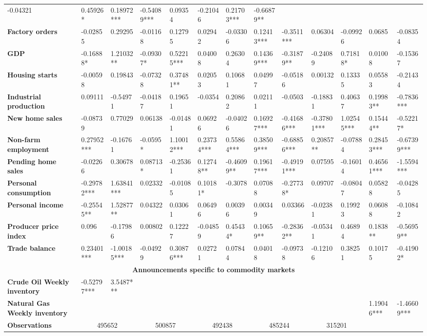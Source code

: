 \begin{sidewaystable}
{\begin{tabular}{@{}lllllllllllll@{}}
-0.04321 & 0.45926* & 0.18972*** & -0.54089*** & 0.09354 & -0.21046 & 0.21703*** & -0.66879** \\ \textbf{Factory orders}& -0.02855 & 0.29295 & -0.01168 & 0.12795 & 0.02942 & -0.03306 & 0.12413*** & -0.3511*** & 0.06304 & -0.09926 & 0.0685 & -0.08354 \\ \textbf{GDP}& -0.16888* & 1.21032** & -0.09307* & 0.52215*** & 0.04008 & 0.26304 & 0.14369*** & -0.31879** & -0.24089 & 0.71818* & 0.01008 & -0.15367 \\ \textbf{Housing starts}& -0.00598 & 0.19843 & -0.07328 & 0.37481** & 0.02053 & 0.10681 & 0.04997 & -0.05186 & 0.00132 & 0.13335 & 0.05583 & -0.21434 \\ \textbf{Industrial production}& 0.09111 & -0.54971 & -0.04187 & 0.19651 & -0.0354 & 0.20862 & 0.02111 & -0.0503 & -0.18831 & 0.40637 & 0.19983** & -0.7836*** \\ \textbf{New home sales}& -0.08739 & 0.77029 & 0.06138 & -0.01481 & 0.06926 & -0.04026 & 0.16927*** & -0.41686*** & -0.37801*** & 1.02545*** & 0.15444** & -0.52217* \\ \textbf{Non-farm employment}& 0.27952*** & -0.16761 & -0.0595* & 1.10012*** & 0.23734*** & 0.55864*** & 0.38509*** & -0.68856*** & 0.20857** & -0.07884 & 0.28453*** & -0.67399*** \\ \textbf{Pending home sales}& -0.02266 & 0.30678 & 0.08713* & -0.25361 & 0.12748** & -0.46099** & 0.19617*** & -0.49191*** & 0.07595 & -0.16014 & 0.46561*** & -1.5594*** \\ \textbf{Personal consumption}& -0.29782*** & 1.63841*** & 0.02332 & -0.01085 & 0.10181* & -0.3078 & 0.07088 & -0.27738* & 0.09707 & -0.08047 & 0.05828 & -0.04285 \\ \textbf{Personal income}& -0.25545** & 1.52877** & 0.04322 & 0.03061 & 0.06496 & 0.00396 & 0.00349 & 0.03366 & -0.02381 & 0.19923 & 0.06088 & -0.10842 \\ \textbf{Producer price index}& 0.096 & -0.17986 & 0.00802 & 0.12227 & -0.04859 & 0.45434* & 0.10659** & -0.28362** & -0.05341 & 0.46894 & 0.1838** & -0.56959** \\ \textbf{Trade balance}& 0.23401*** & -1.00185*** & -0.04929 & 0.30876*** & 0.02721 & 0.07844 & 0.04018 & -0.09738 & -0.12106 & 0.38251 & 0.10175 & -0.41902* \\  \midrule \multicolumn{13}{c}{\textbf{Announcements specific to commodity markets}} \\ \midrule \textbf{Crude Oil Weekly inventory}& -0.52797*** & 3.5487*** &  &  &  &  &  &  &  &  &  &  \\ \textbf{Natural Gas Weekly inventory}&  &  &  &  &  &  &  &  &  &  & 1.19046*** & -1.46609*** \\  \midrule \textbf{Observations}             &\multicolumn{2}{c}{ 495652 }                                                 & \multicolumn{2}{c}{ 500857 }                                                 & \multicolumn{2}{c}{ 492438 }                                                 & \multicolumn{2}{c}{ 485244 }                                                 & \multicolumn{2}{c}{ 315201 }                                                   & 
\end{tabular}}
\end{sidewaystable}
